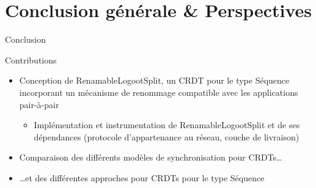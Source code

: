 \section{Conclusion générale \& Perspectives}

\begin{frame}{Conclusion}
  \begin{block}{Contributions}
    \begin{itemize}
      \item \alert{Conception de RenamableLogootSplit, un CRDT pour le type Séquence incorporant un mécanisme de renommage compatible avec les applications pair-à-pair}
      \begin{itemize}
        \item Implémentation et instrumentation de RenamableLogootSplit et de ses dépendances (protocole d'appartenance au réseau, couche de livraison)
      \end{itemize}
      \pause
      \item Comparaison des différents modèles de synchronisation pour CRDTs\dots
      \item \dots et des différentes approches pour CRDTs pour le type Séquence
    \end{itemize}
  \end{block}
\end{frame}

